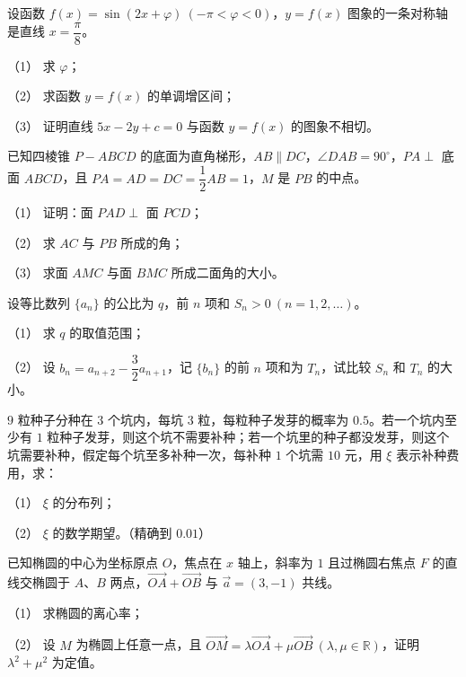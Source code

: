 \begin{question}
设函数 $f(x)=\sin(2x+\varphi)\ (-\pi<\varphi<0)$，$y=f(x)$ 图象的一条对称轴是直线 $x=\dfrac{\pi}{8}$。

（1） 求 $\varphi$；

（2） 求函数 $y=f(x)$ 的单调增区间；

（3） 证明直线 $5x-2y+c=0$ 与函数 $y=f(x)$ 的图象不相切。

\Needspace{0.4\textheight}
\end{question}
\begin{question}
已知四棱锥 $P-ABCD$ 的底面为直角梯形，$AB\parallel DC$，$\angle DAB=90^\circ$，$PA\perp$ 底面 $ABCD$，且 $PA=AD=DC=\dfrac12AB=1$，$M$ 是 $PB$ 的中点。
\nopagebreak[4]
\begin{center}\end{center}
\nopagebreak[4]
（1） 证明：面 $PAD\perp$ 面 $PCD$；

（2） 求 $AC$ 与 $PB$ 所成的角；

（3） 求面 $AMC$ 与面 $BMC$ 所成二面角的大小。

\end{question}
\begin{question}
设等比数列 $\{a_n\}$ 的公比为 $q$，前 $n$ 项和 $S_n>0\ (n=1,2,\ldots)$。

（1） 求 $q$ 的取值范围；

（2） 设 $b_n=a_{n+2}-\dfrac32a_{n+1}$，记 $\{b_n\}$ 的前 $n$ 项和为 $T_n$，试比较 $S_n$ 和 $T_n$ 的大小。

\end{question}
\begin{question}
$9$ 粒种子分种在 $3$ 个坑内，每坑 $3$ 粒，每粒种子发芽的概率为 $0.5$。若一个坑内至少有 $1$ 粒种子发芽，则这个坑不需要补种；若一个坑里的种子都没发芽，则这个坑需要补种，假定每个坑至多补种一次，每补种 $1$ 个坑需 $10$ 元，用 $\xi$ 表示补种费用，求：

（1） $\xi$ 的分布列；

（2） $\xi$ 的数学期望。（精确到 $0.01$）

\end{question}
\begin{question}
已知椭圆的中心为坐标原点 $O$，焦点在 $x$ 轴上，斜率为 $1$ 且过椭圆右焦点 $F$ 的直线交椭圆于 $A\text{、}B$ 两点，$\overrightarrow{OA}+\overrightarrow{OB}$ 与 $\vec a=(3,-1)$ 共线。

（1） 求椭圆的离心率；

（2） 设 $M$ 为椭圆上任意一点，且 $\overrightarrow{OM}=\lambda\overrightarrow{OA}+\mu\overrightarrow{OB}\ (\lambda,\mu\in\mathbb R)$，证明 $\lambda^2+\mu^2$ 为定值。


\end{question}
